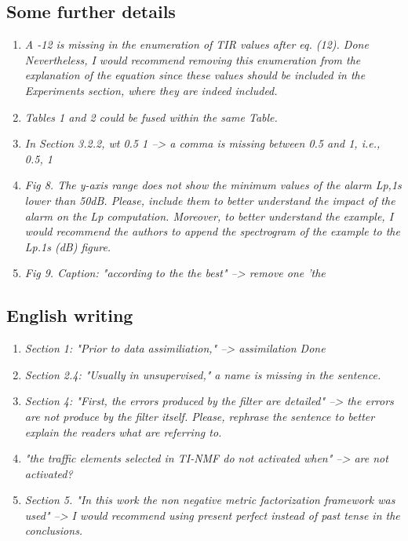 \documentclass[10pt]{article}
\begin{document}
\subsection{Some further details}

\begin{enumerate}
\item \emph{A -12 is missing in the enumeration of TIR values after eq. (12). Done
Nevertheless, I would recommend removing this enumeration from the explanation of the equation since these values should be included in the Experiments section, where they are indeed included.
}

\item \emph{Tables 1 and 2 could be fused within the same Table.}

\item \emph{In Section 3.2.2, wt {0.5 1} --> a comma is missing between 0.5 and 1, i.e., {0.5, 1} }

\item \emph{Fig 8. The y-axis range does not show the minimum values of the alarm Lp,1s lower than 50dB. Please, include them to better understand the impact of the alarm on the Lp computation. Moreover, to better understand the example, I would recommend the authors to append the spectrogram of the example to the Lp.1s (dB) figure.}

\item \emph{Fig 9. Caption: "according to the the best" --> remove one 'the}

\end{enumerate}
\subsection{English writing}

\begin{enumerate}
\item \emph{Section 1: "Prior to data assimiliation," --> assimilation Done}
\item \emph{Section 2.4: "Usually in unsupervised," a name is missing in the sentence.}
\item \emph{Section 4: 
"First, the errors produced by the filter are detailed" --> the errors are not produce by the filter itself. Please, rephrase the sentence to better explain the readers what are referring to.}

\item \emph{"the traffic elements selected in TI-NMF do not activated when" --> are not activated?}

\item \emph{Section 5. "In this work the non negative metric factorization framework was used" --> I would recommend using present perfect instead of past tense in the conclusions.}
\end{enumerate}
\end{document}
